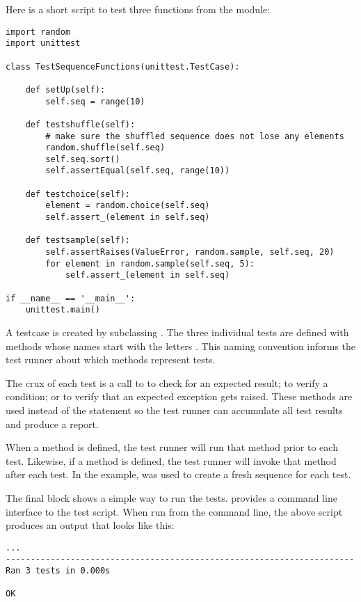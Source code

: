 Here is a short script to test three functions from the
 module:

\begin{verbatim}
import random
import unittest

class TestSequenceFunctions(unittest.TestCase):
    
    def setUp(self):
        self.seq = range(10)

    def testshuffle(self):
        # make sure the shuffled sequence does not lose any elements
        random.shuffle(self.seq)
        self.seq.sort()
        self.assertEqual(self.seq, range(10))

    def testchoice(self):
        element = random.choice(self.seq)
        self.assert_(element in self.seq)

    def testsample(self):
        self.assertRaises(ValueError, random.sample, self.seq, 20)
        for element in random.sample(self.seq, 5):
            self.assert_(element in self.seq)

if __name__ == '__main__':
    unittest.main()
\end{verbatim}

A testcase is created by subclassing .
The three individual tests are defined with methods whose names start with
the letters .  This naming convention informs the test runner
about which methods represent tests.

The crux of each test is a call to  to
check for an expected result;  to verify a condition;
or  to verify that an expected exception gets
raised.  These methods are used instead of the  statement
so the test runner can accumulate all test results and produce a report.

When a  method is defined, the test runner will run that
method prior to each test.  Likewise, if a  method is
defined, the test runner will invoke that method after each test.  In the
example,  was used to create a fresh sequence for each test.

The final block shows a simple way to run the tests.  
provides a command line interface to the test script.  When run from the
command line, the above script produces an output that looks like this:

\begin{verbatim}
...
----------------------------------------------------------------------
Ran 3 tests in 0.000s

OK
\end{verbatim}

